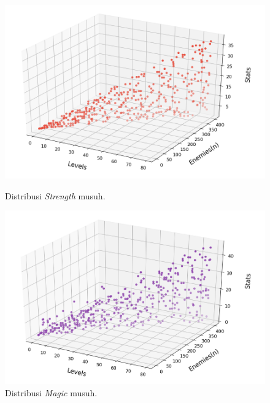 \begin{figure} [!h]
	\begin{minipage}[t]{1.0\linewidth}
		\centering
		\includegraphics[scale=0.57]{img/EnemyStrengthDistrib.png}
		\caption{Distribusi \textit{Strength} musuh.}
		\label{fig:enemy_str_distrib}
		\vspace{2ex}
	\end{minipage}
	\vfill
	\begin{minipage}[t]{1.0\linewidth}
		\centering
		\includegraphics[scale=0.57]{img/EnemyMagicDistrib.png}
		\caption{Distribusi \textit{Magic} musuh.}
		\label{fig:enemy_mag_distrib}
	\end{minipage} 
\end{figure}

